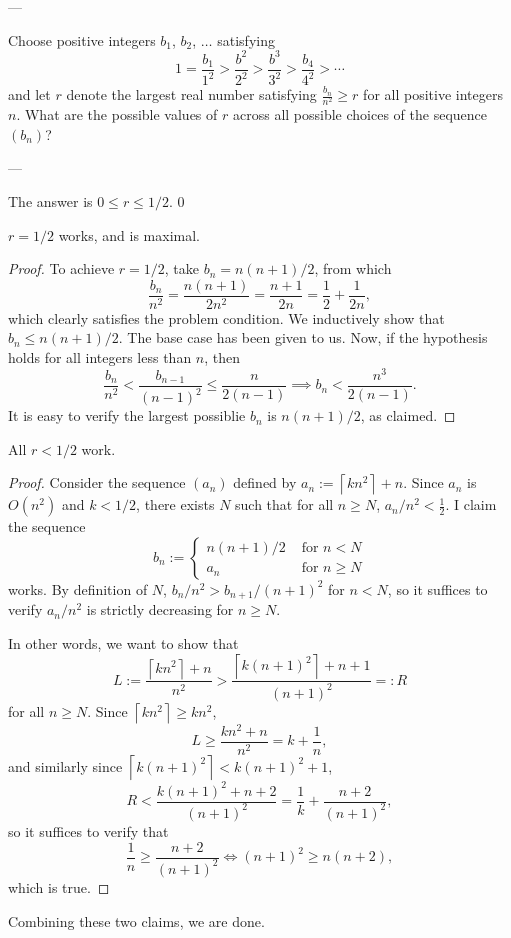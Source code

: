 
---

Choose positive integers $b_1$, $b_2$, $\ldots$ satisfying \[1=\frac{b_1}{1^2}>\frac{b^2}{2^2}>\frac{b^3}{3^2}>\frac{b_4}{4^2}>\cdots\]
and let $r$ denote the largest real number satisfying $\frac{b_n}{n^2}\ge r$ for all positive integers $n$. What are the possible values of $r$ across all possible choices of the sequence $(b_n)$?

---

The answer is $0\le r\le1/2$.
\setcounter{iclaim}0
\begin{iclaim}
    $r=1/2$ works, and is maximal.
\end{iclaim}
\begin{proof}
    To achieve $r=1/2$, take $b_n=n(n+1)/2$, from which \[\frac{b_n}{n^2}=\frac{n(n+1)}{2n^2}=\frac{n+1}{2n}=\frac12+\frac1{2n},\]
    which clearly satisfies the problem condition. We inductively show that $b_n\le n(n+1)/2$. The base case has been given to us. Now, if the hypothesis holds for all integers less than $n$, then \[\frac{b_n}{n^2}<\frac{b_{n-1}}{(n-1)^2}\le\frac n{2(n-1)}\implies b_n<\frac{n^3}{2(n-1)}.\]
    It is easy to verify the largest possiblie $b_n$ is $n(n+1)/2$, as claimed.
\end{proof}
\begin{iclaim}
    All $r<1/2$ work.
\end{iclaim}
\begin{proof}
    Consider the sequence $(a_n)$ defined by $a_n:=\left\lceil kn^2\right\rceil+n$. Since $a_n$ is $O(n^2)$ and $k<1/2$, there exists $N$ such that for all $n\ge N$, $a_n/n^2<\frac12$. I claim the sequence \[b_n:=\begin{cases}n(n+1)/2&\text{ for }n<N\\ a_n&\text{ for }n\ge N\end{cases}\]
    works. By definition of $N$, $b_n/n^2>b_{n+1}/(n+1)^2$ for $n<N$, so it suffices to verify $a_n/n^2$ is strictly decreasing for $n\ge N$.

    In other words, we want to show that \[L:=\frac{\left\lceil kn^2\right\rceil+n}{n^2}>\frac{\left\lceil k(n+1)^2\right\rceil+n+1}{(n+1)^2}=:R\]
    for all $n\ge N$. Since $\left\lceil kn^2\right\rceil\ge kn^2$, \[L\ge\frac{kn^2+n}{n^2}=k+\frac1n,\]
    and similarly since $\left\lceil k(n+1)^2\right\rceil<k(n+1)^2+1$, \[R<\frac{k(n+1)^2+n+2}{(n+1)^2}=\frac1k+\frac{n+2}{(n+1)^2},\]
    so it suffices to verify that \[\frac1n\ge\frac{n+2}{(n+1)^2}\iff(n+1)^2\ge n(n+2),\]
    which is true.
\end{proof}

Combining these two claims, we are done.

